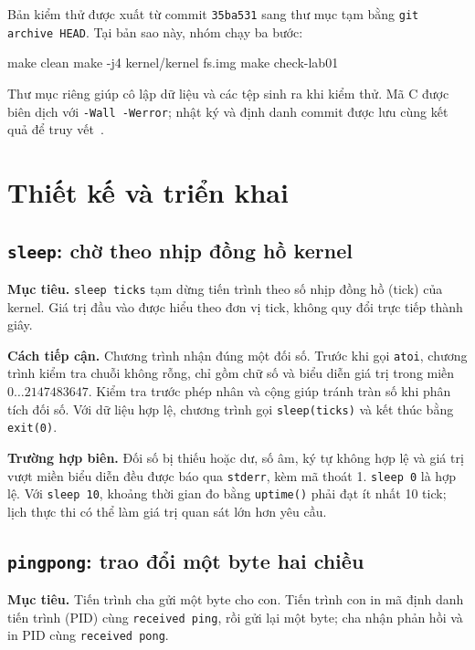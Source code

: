 \documentclass[12pt,a4paper]{article}
\newcommand{\code}[1]{\texttt{#1}}
\begin{document}
Bản kiểm thử được xuất từ commit \code{35ba531} sang thư mục tạm bằng \code{git archive HEAD}. Tại bản sao này, nhóm chạy ba bước:
\begin{terminal}
make clean
make -j4 kernel/kernel fs.img
make check-lab01
\end{terminal}
Thư mục riêng giúp cô lập dữ liệu và các tệp sinh ra khi kiểm thử. Mã C được biên dịch với \code{-Wall -Werror}; nhật ký và định danh commit được lưu cùng kết quả để truy vết~\cite{evidence}.

\clearpage
\section{Thiết kế và triển khai}\label{sec:design}
\subsection{\texttt{sleep}: chờ theo nhịp đồng hồ kernel}
\textbf{Mục tiêu.} \code{sleep ticks} tạm dừng tiến trình theo số nhịp đồng hồ (tick) của kernel. Giá trị đầu vào được hiểu theo đơn vị tick, không quy đổi trực tiếp thành giây.

\textbf{Cách tiếp cận.} Chương trình nhận đúng một đối số. Trước khi gọi \code{atoi}, chương trình kiểm tra chuỗi không rỗng, chỉ gồm chữ số và biểu diễn giá trị trong miền $0\ldots 2147483647$. Kiểm tra trước phép nhân và cộng giúp tránh tràn số khi phân tích đối số. Với dữ liệu hợp lệ, chương trình gọi \code{sleep(ticks)} và kết thúc bằng \code{exit(0)}.

\textbf{Trường hợp biên.} Đối số bị thiếu hoặc dư, số âm, ký tự không hợp lệ và giá trị vượt miền biểu diễn đều được báo qua \code{stderr}, kèm mã thoát 1. \code{sleep 0} là hợp lệ. Với \code{sleep 10}, khoảng thời gian đo bằng \code{uptime()} phải đạt ít nhất 10 tick; lịch thực thi có thể làm giá trị quan sát lớn hơn yêu cầu.

\subsection{\texttt{pingpong}: trao đổi một byte hai chiều}
\textbf{Mục tiêu.} Tiến trình cha gửi một byte cho con. Tiến trình con in mã định danh tiến trình (PID) cùng \code{received ping}, rồi gửi lại một byte; cha nhận phản hồi và in PID cùng \code{received pong}.
\end{document}

